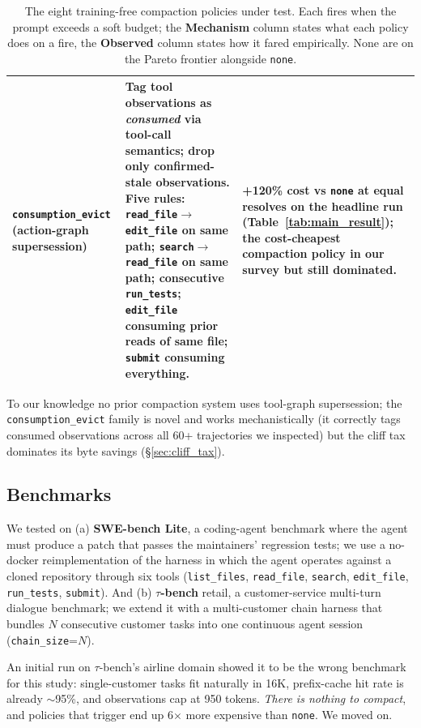 \documentclass[letterpaper,twocolumn,10pt]{article}
\begin{document}
\begin{table}[t]
\begin{tabular}{p{} p{} p{}}
\texttt{consumption\_evict} \newline (action-graph supersession) &
Tag tool observations as \emph{consumed} via tool-call semantics; drop only confirmed-stale observations. Five rules: \texttt{read\_file}$\to$\texttt{edit\_file} on same path; \texttt{search}$\to$\texttt{read\_file} on same path; consecutive \texttt{run\_tests}; \texttt{edit\_file} consuming prior reads of same file; \texttt{submit} consuming everything. &
+120\% cost vs \texttt{none} at equal resolves on the headline run (Table~\ref{tab:main_result}); the cost-cheapest compaction policy in our survey but still dominated. \\
\bottomrule
\end{tabular}
\caption{The eight training-free compaction policies under test.
Each fires when the prompt exceeds a soft budget; the
\textbf{Mechanism} column states what each policy does on a fire,
the \textbf{Observed} column states how it fared empirically.
None are on the Pareto frontier alongside \texttt{none}.}
\label{tab:policy_summary}
\end{table}

To our knowledge no prior compaction system uses tool-graph
supersession; the \texttt{consumption\_evict} family is novel
and works mechanistically (it correctly tags consumed
observations across all 60+ trajectories we inspected) but the
cliff tax dominates its byte savings (\S\ref{sec:cliff_tax}).

\subsection{Benchmarks}

We tested on (a) \textbf{SWE-bench Lite}, a coding-agent
benchmark where the agent must produce a patch that passes the
maintainers' regression tests; we use a no-docker reimplementation
of the harness in which the agent operates against a cloned
repository through six tools (\texttt{list\_files},
\texttt{read\_file}, \texttt{search}, \texttt{edit\_file},
\texttt{run\_tests}, \texttt{submit}). And (b) \textbf{$\tau$-bench}
retail, a customer-service multi-turn dialogue benchmark; we extend
it with a multi-customer chain harness that bundles $N$ consecutive
customer tasks into one continuous agent session
(\texttt{chain\_size}=$N$).

An initial run on $\tau$-bench's airline domain showed it to be
the wrong benchmark for this study: single-customer tasks fit
naturally in 16K, prefix-cache hit rate is already $\sim$95\%,
and observations cap at 950 tokens. \emph{There is nothing to
compact}, and policies that trigger end up 6$\times$ more
expensive than \texttt{none}. We moved on.
\end{document}

